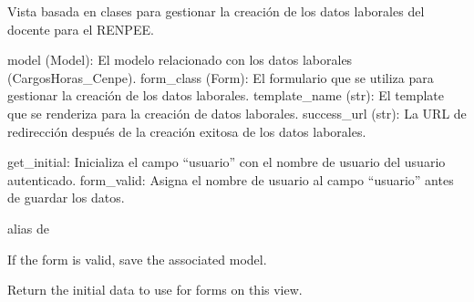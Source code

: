 \documentclass[letterpaper,10pt,spanish]{sphinxmanual}
\begin{document}
\begin{fulllineitems}

\pysigstartsignatures
{}
\pysigstopsignatures
\sphinxAtStartPar
Vista basada en clases para gestionar la creación de los datos laborales del docente para el RENPEE.
\begin{description}
\sphinxAtStartPar
model (Model): El modelo relacionado con los datos laborales (CargosHoras\_Cenpe).
form\_class (Form): El formulario que se utiliza para gestionar la creación de los datos laborales.
template\_name (str): El template que se renderiza para la creación de datos laborales.
success\_url (str): La URL de redirección después de la creación exitosa de los datos laborales.

\sphinxAtStartPar
get\_initial: Inicializa el campo “usuario” con el nombre de usuario del usuario autenticado.
form\_valid: Asigna el nombre de usuario al campo “usuario” antes de guardar los datos.

\end{description}


\begin{fulllineitems}

\pysigstartsignatures
{}
\pysigstopsignatures
\sphinxAtStartPar
alias de 

\end{fulllineitems}



\begin{fulllineitems}

\pysigstartsignatures
{}
\pysigstopsignatures
\sphinxAtStartPar
If the form is valid, save the associated model.

\end{fulllineitems}



\begin{fulllineitems}

\pysigstartsignatures
{}
\pysigstopsignatures
\sphinxAtStartPar
Return the initial data to use for forms on this view.


\end{fulllineitems}
\end{fulllineitems}
\end{document}
